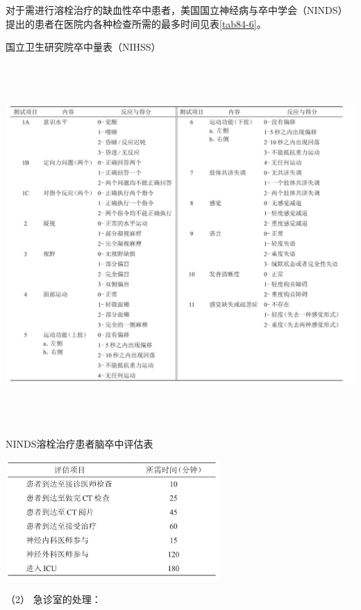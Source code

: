对于需进行溶栓治疗的缺血性卒中患者，美国国立神经病与卒中学会（NINDS）提出的患者在医院内各种检查所需的最多时间见表\ref{tab84-6}。

\begin{table}[htbp]
\centering
\caption{国立卫生研究院卒中量表（NIHSS）}
\label{tab84-5}
\includegraphics[width=6.79167in,height=5.41667in]{./images/Image00374.jpg}
\end{table}

\begin{table}[htbp]
\centering
\caption{NINDS溶栓治疗患者脑卒中评估表}
\label{tab84-6}
\includegraphics[width=3.20833in,height=1.78125in]{./images/Image00375.jpg}
\end{table}

\hypertarget{text00242.htmlux5cux23CHP8-1-2-3-2-2-2}{}
（2） 急诊室的处理：


